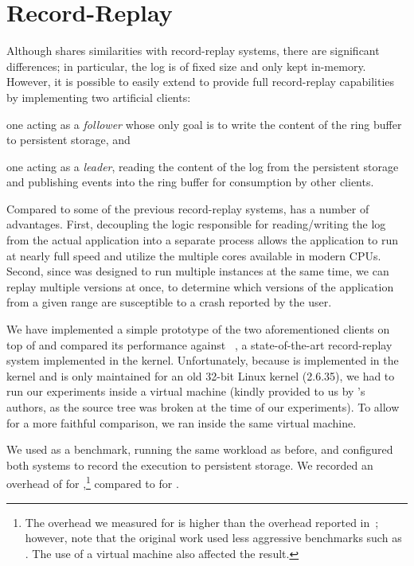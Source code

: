 \section{Record-Replay}
\label{sec:record_replay}

Although \varan shares similarities with record-replay systems, there are
significant differences; in particular, the log is of fixed size and
only kept in-memory.  However, it is possible to easily extend \varan to
provide full record-replay capabilities by implementing two artificial
clients:
\begin{inparaenum}[(i)]
\item one acting as a \emph{follower} whose only goal is to write the
  content of the ring buffer to persistent storage, and
\item one acting as a \emph{leader}, reading the content of the log
  from the persistent storage and publishing events into the ring
  buffer for consumption by other clients.
\end{inparaenum}

Compared to some of the previous record-replay systems, \varan has a
number of advantages. First, decoupling the logic responsible for
reading/writing the log from the actual application into a separate
process allows the application to run at nearly full speed and utilize
the multiple cores available in modern CPUs.  Second, since \varan was
designed to run multiple instances at the same time, we can replay
multiple versions at once, \eg to determine which versions of the
application from a given range are susceptible to a crash reported by
the user.

We have implemented a simple prototype of the two aforementioned
clients on top of \varan and compared its performance against
\scribe~\cite{scribe}, a state-of-the-art record-replay system
implemented in the kernel.  Unfortunately, because \scribe is
implemented in the kernel and is only maintained for an old 32-bit
Linux kernel (2.6.35), we had to run our experiments inside a virtual
machine (kindly provided to us by \scribe's authors, as the source tree
was broken at the time of our experiments). 
To allow for a more faithful comparison, we ran \varan inside the same
virtual machine.

We used \redis as a benchmark, running the same workload as before,
and configured both systems to record the execution to persistent
storage.  We recorded an overhead of \redisRROvhScribe for
\scribe,\footnote{The overhead we measured for \scribe is higher than
  the overhead reported in~\cite{scribe}; however, note that the original
  work used less aggressive benchmarks such as \httpd.  The use of a
  virtual machine also affected the result.}  compared to
\redisRROvhNx for \varan.




